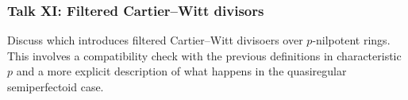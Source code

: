 \documentclass{article}
\begin{document}
\subsubsection*{Talk XI: Filtered Cartier--Witt divisors}
Discuss \cite[Section 5.3-5.5]{bhatt2022prismatic} which introduces filtered Cartier--Witt divisoers over $p$-nilpotent rings. This involves a compatibility check with the previous definitions in characteristic $p$ and a more explicit description of what happens in the quasiregular semiperfectoid case.
\printbibliography
\end{document}
